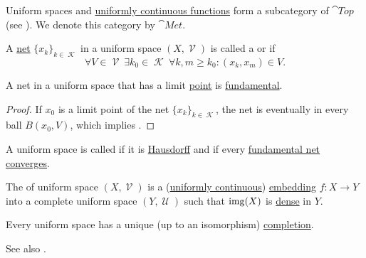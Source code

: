 \begin{definition}\label{def:category_of_uniform_spaces}
  Uniform spaces and \hyperref[def:uniform_continuity]{uniformly continuous functions} form a subcategory of \( \cat{Top} \) (see ). We denote this category by \( \cat{Met} \).
\end{definition}

\begin{definition}\label{def:fundamental_net}
  A \hyperref[def:topological_net]{net} \( \{ x_k \}_{k \in \mscrK} \) in a uniform space \( (X, \mscrV) \) is called a  or  if
  \begin{equation*}
    \forall V \in \mscrV \ \exists k_0 \in \mscrK \ \forall k, m \geq k_0 : (x_k, x_m) \in V.
  \end{equation*}
\end{definition}

\begin{lemma}\label{thm:convergent_net_is_fundamental}
  A net in a uniform space that has a limit \hyperref[def:net_convergence/limit]{point} is \hyperref[def:fundamental_net]{fundamental}.
\end{lemma}
\begin{proof}
  If \( x_0 \) is a limit point of the net \( \{ x_k \}_{k \in \mscrK} \), the net is eventually in every ball \( B(x_0, V) \), which implies .
\end{proof}

\begin{definition}\label{def:complete_uniform_space}\mcite\cite[446]{Engelking1989}
  A uniform space is called  if it is \hyperref[def:separation_axioms/T2]{Hausdorff} and if every \hyperref[def:fundamental_net]{fundamental net} \hyperref[def:net_convergence/limit]{converges}.

  The  of uniform space \( (X, \mscrV) \) is a (\hyperref[def:uniform_continuity]{uniformly continuous}) \hyperref[def:morphism_invertibility/monomorphism]{embedding} \( f: X \to Y \) into a complete uniform space \( (Y, \mscrU) \) such that \( \operatorname{img}(X) \) is \hyperref[def:topologically_dense_set/dense]{dense} in \( Y \).
\end{definition}

\begin{theorem}\label{thm:uniform_space_completion}\mcite\cite[thm. 8.3.12]{Engelking1989}
  Every uniform space has a unique (up to an isomorphism) \hyperref[def:complete_uniform_space]{completion}.

  See also .
\end{theorem}

